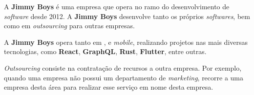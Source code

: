 
\begin{minipage}[t!]{0.35\textwidth}
\end{minipage}
\begin{minipage}[t!]{.65\textwidth}
	\minipagerestore

	A \textbf{Jimmy Boys} é uma empresa que opera no ramo do desenvolvimento de \textit{software} desde 2012. A \textbf{Jimmy Boys} desenvolve tanto os próprios \textit{softwares}, bem como em \textit{outsourcing} para outras empresas.

	A \textbf{Jimmy Boys} opera tanto em \textit{}, \textit{} e \textit{mobile}, realizando projetos nas mais diversas tecnologias, como \textbf{React}, \textbf{GraphQL}, \textbf{Rust}, \textbf{Flutter}, entre outras.
\end{minipage}

\vspace{0.2cm}

\textit{Outsourcing} consiste na contratação de recursos a outra empresa. Por exemplo, quando uma empresa não possui um departamento de \textit{marketing}, recorre a uma empresa desta área para realizar esse serviço em nome desta empresa.

